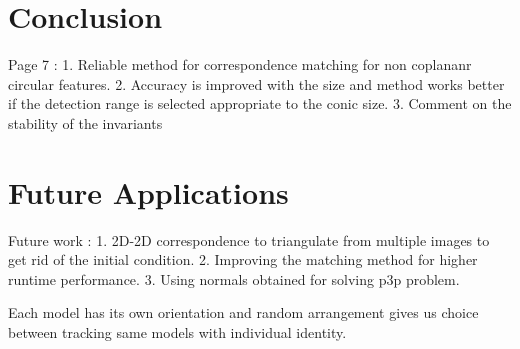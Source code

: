 \documentclass{bmvc2k}
\begin{document}
\section{Conclusion}
Page 7 : 
1. Reliable method for correspondence matching for non coplananr circular features. 
2. Accuracy is improved with the size and method works better if the detection range is selected appropriate to the conic size. 
3. Comment on the stability of the invariants 

\section{Future Applications}
Future work : 
1. 2D-2D correspondence to triangulate from multiple images to get rid of the initial condition. 
2. Improving the matching method for higher runtime performance.
3. Using normals obtained for solving p3p problem. 

Each model has its own orientation and random arrangement gives us choice between tracking same models with individual identity. 



\end{document}
